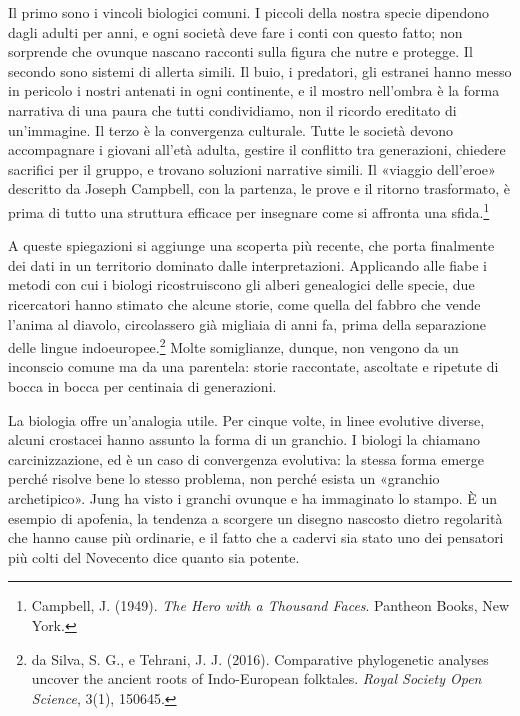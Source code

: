 Il primo sono i vincoli biologici comuni. I piccoli della nostra specie dipendono dagli adulti per anni, e ogni società deve fare i conti con questo fatto; non sorprende che ovunque nascano racconti sulla figura che nutre e protegge. Il secondo sono sistemi di allerta simili. Il buio, i predatori, gli estranei hanno messo in pericolo i nostri antenati in ogni continente, e il mostro nell'ombra è la forma narrativa di una paura che tutti condividiamo, non il ricordo ereditato di un'immagine. Il terzo è la convergenza culturale. Tutte le società devono accompagnare i giovani all'età adulta, gestire il conflitto tra generazioni, chiedere sacrifici per il gruppo, e trovano soluzioni narrative simili. Il «viaggio dell'eroe» descritto da Joseph Campbell, con la partenza, le prove e il ritorno trasformato, è prima di tutto una struttura efficace per insegnare come si affronta una sfida.\footnote{Campbell, J. (1949). \textit{The Hero with a Thousand Faces}. Pantheon Books, New York.}

A queste spiegazioni si aggiunge una scoperta più recente, che porta finalmente dei dati in un territorio dominato dalle interpretazioni. Applicando alle fiabe i metodi con cui i biologi ricostruiscono gli alberi genealogici delle specie, due ricercatori hanno stimato che alcune storie, come quella del fabbro che vende l'anima al diavolo, circolassero già migliaia di anni fa, prima della separazione delle lingue indoeuropee.\footnote{da Silva, S. G., e Tehrani, J. J. (2016). Comparative phylogenetic analyses uncover the ancient roots of Indo-European folktales. \textit{Royal Society Open Science}, 3(1), 150645.} Molte somiglianze, dunque, non vengono da un inconscio comune ma da una parentela: storie raccontate, ascoltate e ripetute di bocca in bocca per centinaia di generazioni.

La biologia offre un'analogia utile. Per cinque volte, in linee evolutive diverse, alcuni crostacei hanno assunto la forma di un granchio. I biologi la chiamano carcinizzazione, ed è un caso di convergenza evolutiva: la stessa forma emerge perché risolve bene lo stesso problema, non perché esista un «granchio archetipico». Jung ha visto i granchi ovunque e ha immaginato lo stampo. È un esempio di apofenia, la tendenza a scorgere un disegno nascosto dietro regolarità che hanno cause più ordinarie, e il fatto che a cadervi sia stato uno dei pensatori più colti del Novecento dice quanto sia potente.

